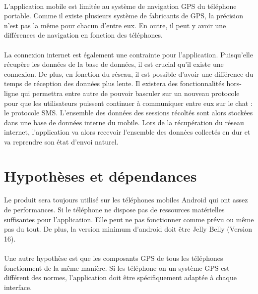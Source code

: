 \documentclass[titlepage, 12pt]{report}
\begin{document}
\paragraph{}L'application mobile est limitée au système de navigation GPS du téléphone portable. Comme il existe plusieurs système de fabricants de GPS, la précision n'est pas la même pour chacun d'entre eux. En outre, il peut y avoir une différences de navigation en fonction des téléphones.

\paragraph{}La connexion internet est également une contrainte pour l'application. Puisqu'elle récupère les données de la base de données, il est crucial qu'il existe une connexion. De plus, en fonction du réseau, il est possible d'avoir une différence du temps de réception des données plus lente.
Il existera des fonctionnalités hors-ligne qui permettra entre autre de pouvoir basculer sur un nouveau protocole pour que les utilisateurs puissent continuer à communiquer entre eux sur le chat : le protocole SMS. L'ensemble des données des sessions récoltés sont alors stockées dans une base de données interne du mobile. Lors de la récupération du réseau internet, l'application va alors recevoir l'ensemble des données collectés en dur et va reprendre son état d'envoi naturel.

\section{Hypothèses et dépendances}

\paragraph{}Le produit sera toujours utilisé sur les téléphones mobiles Android qui ont assez de performances. Si le téléphone ne dispose pas de ressources matérielles suffisantes pour l'application. Elle peut ne pas fonctionner comme prévu ou même pas du tout.
De plus, la version minimum d'android doit être Jelly Belly (Version 16). 

\paragraph{}Une autre hypothèse est que les composants GPS de tous les téléphones fonctionnent de la même manière. Si les téléphone on un système GPS est différent des normes, l'application doit être spécifiquement adaptée à chaque interface.
\end{document}
